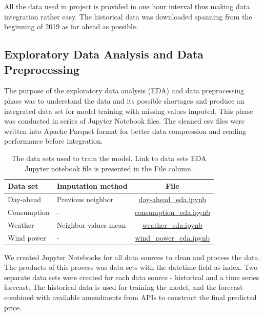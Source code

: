 \documentclass{article}
\begin{document}
All the data used in project is provided in one hour interval thus making data integration rather easy. The historical data was downloaded spanning from the beginning of 2019 as far ahead as possible.

\subsection{Exploratory Data Analysis and Data Preprocessing}
\label{subsection:eda}

The purpose of the exploratory data analysis (EDA) and data preprocessing phase was to understand the data and its possible shortages and produce an integrated data set for model training with missing values imputed. This phase was conducted in series of Jupyter Notebook files. The cleaned csv files were written into Apache Parquet format for better data compression and reading performance before integration.

\begin{table}[b] 
\centering 
\begin{tabular}{l||l c} 
Data set & Imputation method & File\\ 
\hline \hline
Day-ahead & Previous neighbor & \href{https://github.com/IDS-mini/electricity/blob/main/data/day-ahead_eda.ipynb}{day-ahead\_eda.ipynb}\\
Consumption & - & \href{https://github.com/IDS-mini/electricity/blob/main/data/consumption_eda.ipynb}{consumption\_eda.ipynb} \\
Weather & Neighbor values mean & \href{https://github.com/IDS-mini/electricity/blob/main/data/weather_eda.ipynb}{weather\_eda.ipynb} \\
Wind power & - & \href{https://github.com/IDS-mini/electricity/blob/main/data/wind_power_eda.ipynb}{wind\_power\_eda.ipynb}\\
\hline
\end{tabular}
\caption{The data sets used to train the model. Link to data sets EDA Jupyter notebook file is presented in the File column.}
\label{table:eda}
\end{table}

We created Jupyter Notebooks for all data sources to clean and process the data.
The products of this process was data sets with the datetime field as index.
Two separate data sets were created for each data source - historical and a time series forecast.
The historical data is used for training the model, and the forecast combined with available amendments from APIs to construct the final predicted price.
\end{document}
